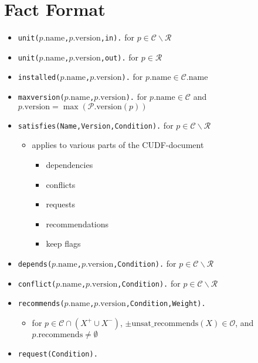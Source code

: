 \documentclass[a4paper,english]{article}
\begin{document}
\section{Fact Format}

\begin{itemize}
  \item \texttt{unit($p.\mathrm{name}$,$p.\mathrm{version}$,in).} for $p\in\mathcal{C}\backslash\mathcal{R}$
  \item \texttt{unit($p.\mathrm{name}$,$p.\mathrm{version}$,out).} for $p\in\mathcal{R}$
  \item \texttt{installed($p.\mathrm{name}$,$p.\mathrm{version}$).} for $p.\mathrm{name}\in \mathcal{C}.\mathrm{name}$
  \item \texttt{maxversion($p.\mathrm{name}$,$p.\mathrm{version}$).} for $p.\mathrm{name} \in \mathcal{C}$ and $p.\mathrm{version}=\max(\mathcal{P}.\mathrm{version}(p))$
  \item \texttt{satisfies(Name,Version,Condition).} for $p\in\mathcal{C}\backslash\mathcal{R}$
    \begin{itemize}
      \item applies to various parts of the CUDF-document
        \begin{itemize}
          \item dependencies
          \item conflicts
          \item requests
          \item recommendations
          \item keep flags
        \end{itemize}
    \end{itemize}
  \item \texttt{depends($p.\mathrm{name}$,$p.\mathrm{version}$,Condition).} for $p\in\mathcal{C}\backslash\mathcal{R}$
  \item \texttt{conflict($p.\mathrm{name}$,$p.\mathrm{version}$,Condition).} for $p\in\mathcal{C}\backslash\mathcal{R}$
  \item \texttt{recommends($p.\mathrm{name}$,$p.\mathrm{version}$,Condition,Weight).}
    \begin{itemize}
      \item for $p\in\mathcal{C}\cap(X^{+}\cup X^{-})$, $\pm\mathrm{unsat\_recommends}(X)\in\mathcal{O}$, and $p.\mathrm{recommends}\not=\emptyset$
    \end{itemize}
  \item \texttt{request(Condition).}
    \begin{itemize}

\end{itemize}
\end{itemize}
\end{document}
